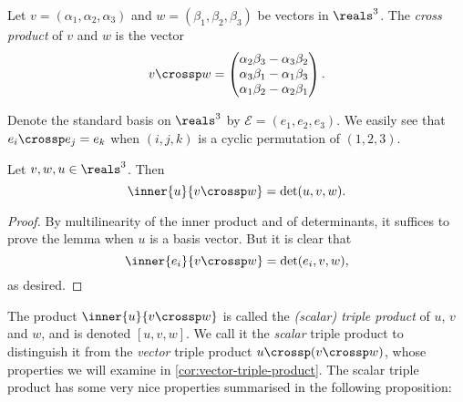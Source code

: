 \documentclass[article, a4paper, 11pt, oneside]{memoir}
\numberwithin{equation}{chapter}
\newcommand{\calE}{\mathcal{E}}
\begin{document}
\begin{definition}
    Let $v = (\alpha_1, \alpha_2, \alpha_3)$ and $w = (\beta_1, \beta_2, \beta_3)$ be vectors in $\reals^3$. The \emph{cross product} of $v$ and $w$ is the vector
    \begin{equation*}
        v \crossp w =
        \begin{pmatrix}
            \alpha_2 \beta_3 - \alpha_3 \beta_2 \\
            \alpha_3 \beta_1 - \alpha_1 \beta_3 \\
            \alpha_1 \beta_2 - \alpha_2 \beta_1
        \end{pmatrix}.
    \end{equation*}
\end{definition}
%
Denote the standard basis on $\reals^3$ by $\calE = (e_1, e_2, e_3)$. We easily see that $e_i \crossp e_j = e_k$ when $(i,j,k)$ is a cyclic permutation of $(1,2,3)$.


\begin{lemma}
    \label{lem:cross-product-determinant}
    Let $v,w,u \in \reals^3$. Then
    \begin{equation*}
        \inner{u}{v \crossp w}
            = \det(u,v,w).
    \end{equation*}
\end{lemma}

\begin{proof}
    By multilinearity of the inner product and of determinants, it suffices to prove the lemma when $u$ is a basis vector. But it is clear that
    \begin{equation*}
        \inner{e_i}{v \crossp w}
            = \det(e_i,v,w),
    \end{equation*}
    as desired.
\end{proof}


The product $\inner{u}{v \crossp w}$ is called the \emph{(scalar) triple product} of $u$, $v$ and $w$, and is denoted $[u,v,w]$. We call it the \emph{scalar} triple product to distinguish it from the \emph{vector} triple product $u \crossp (v \crossp w)$, whose properties we will examine in \cref{cor:vector-triple-product}. The scalar triple product has some very nice properties summarised in the following proposition:
\end{document}
